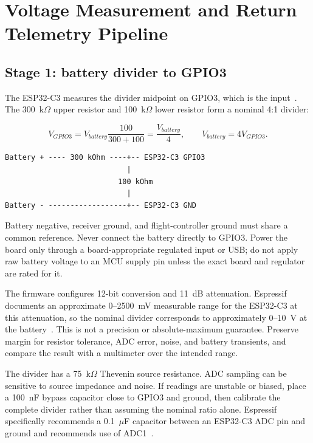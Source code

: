 \documentclass[11pt,a4paper]{article}
\newcommand{\code}[1]{\texttt{\detokenize{#1}}}
\begin{document}
\section{Voltage Measurement and Return Telemetry Pipeline}

\subsection{Stage 1: battery divider to GPIO3}

The ESP32-C3 measures the divider midpoint on GPIO3, which is the
\code{ADC1_CH3} input~\cite{espressif-c3-datasheet}. The 300~k$\Omega$ upper
resistor and 100~k$\Omega$ lower resistor form a nominal 4:1 divider:

\[
V_{GPIO3}=V_{battery}\frac{100}{300+100}=\frac{V_{battery}}{4},
\qquad
V_{battery}=4V_{GPIO3}.
\]

\begin{lstlisting}
Battery + ---- 300 kOhm ----+-- ESP32-C3 GPIO3
                            |
                          100 kOhm
                            |
Battery - ------------------+-- ESP32-C3 GND
\end{lstlisting}

Battery negative, receiver ground, and flight-controller ground must share a
common reference. Never connect the battery directly to GPIO3. Power the board
only through a board-appropriate regulated input or USB; do not apply raw
battery voltage to an MCU supply pin unless the exact board and regulator are
rated for it.

The firmware configures 12-bit conversion and 11~dB attenuation. Espressif
documents an approximate 0--2500~mV measurable range for the ESP32-C3 at this
attenuation, so the nominal divider corresponds to approximately 0--10~V at the
battery~\cite{arduino-esp32-adc}. This is not a precision or absolute-maximum
guarantee. Preserve margin for resistor tolerance, ADC error, noise, and battery
transients, and compare the result with a multimeter over the intended range.

The divider has a 75~k$\Omega$ Thevenin source resistance. ADC sampling can be
sensitive to source impedance and noise. If readings are unstable or biased,
place a 100~nF bypass capacitor close to GPIO3 and ground, then calibrate the
complete divider rather than assuming the nominal ratio alone. Espressif
specifically recommends a 0.1~$\mu$F capacitor between an ESP32-C3 ADC pin and
ground and recommends use of ADC1~\cite{espressif-c3-hardware-guidelines}.
\end{document}
